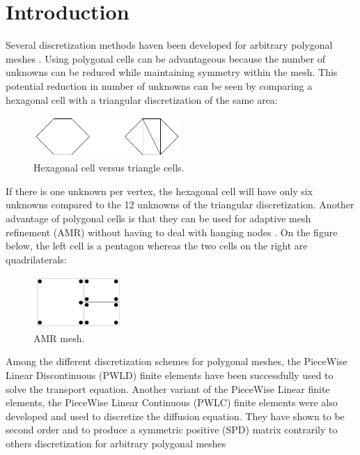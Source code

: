 \section{Introduction}
Several discretization methods haven been developed for arbitrary polygonal
meshes \cite{pwld_2d,pwld_3d,pwl_diffusion,palmer_ane,palmer_proc,palmer_fe,
wachspress,cell_centered_diff,mimetic}.  Using polygonal
cells can be advantageous because the number of unknowns can be reduced while
maintaining symmetry within the mesh. This potential reduction in 
number of unknowns can be seen by comparing a hexagonal cell with a triangular
discretization of the same area:
\begin{figure}[H]
\centering
\includegraphics[width=0.5\textwidth]{hex_tri_cells}
\caption{Hexagonal cell versus triangle cells.}
\end{figure}
If there is one unknown per vertex, the hexagonal cell will have only six
unknowns compared to the 12 unknowns of the triangular discretization. Another 
advantage of polygonal cells is that they can be used for adaptive mesh refinement 
(AMR) \cite{amr_rad,amr_block,amr_unstruc} without having to
deal with hanging nodes \cite{arbitrary_hanging_nodes,dealII_hanging_nodes,
locally_hanging_nodes}. On the figure below, the left cell is a pentagon whereas 
the two cells on the right are quadrilaterals:
\begin{figure}[H]
\centering
\includegraphics[width=0.3\textwidth]{amr}
\caption{AMR mesh.}
\end{figure}
Among the different discretization schemes for polygonal meshes, the PieceWise 
Linear Discontinuous (PWLD) finite elements \cite{pwld_2d,pwld_3d} have been 
successfully used to solve the transport equation. Another variant of the
PieceWise Linear finite elements, the PieceWise Linear Continuous (PWLC) finite 
elements were also developed and used to discretize the diffusion equation. 
They have shown to be second order and to produce a symmetric positive (SPD) 
matrix contrarily to others discretization for arbitrary polygonal meshes 
